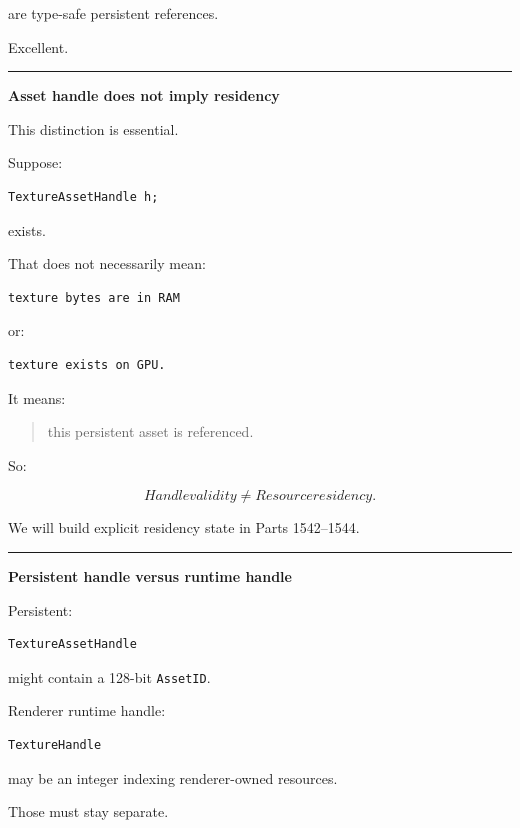 are type-safe persistent references.

Excellent.

\begin{center}\rule{0.5\linewidth}{0.5pt}\end{center}

\textbf{Asset handle does not imply residency}

This distinction is essential.

Suppose:

\begin{verbatim}
TextureAssetHandle h;
\end{verbatim}

exists.

That does not necessarily mean:

\begin{verbatim}
texture bytes are in RAM
\end{verbatim}

or:

\begin{verbatim}
texture exists on GPU.
\end{verbatim}

It means:

\begin{quote}
this persistent asset is referenced.
\end{quote}

So:

\[
\boxed{
Handle validity
\neq
Resource residency.
}
\]

We will build explicit residency state in Parts 1542--1544.

\begin{center}\rule{0.5\linewidth}{0.5pt}\end{center}

\textbf{Persistent handle versus runtime handle}

Persistent:

\begin{verbatim}
TextureAssetHandle
\end{verbatim}

might contain a 128-bit \texttt{AssetID}.

Renderer runtime handle:

\begin{verbatim}
TextureHandle
\end{verbatim}

may be an integer indexing renderer-owned resources.

Those must stay separate.

